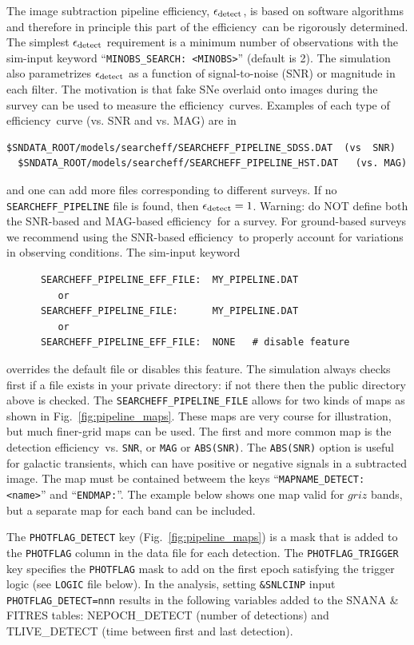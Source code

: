 \documentclass[12pt]{article}
\newcommand{\eff}{efficiency}
\newcommand{\simeffsub}{\epsilon_{\rm detect}}  %
\begin{document}
{The image subtraction pipeline \eff, $\simeffsub$,
is based on software algorithms and therefore
in principle this part of the \eff\ can be 
rigorously determined.
The simplest $\simeffsub$ requirement
is a minimum number of observations with
the sim-input keyword ``{\tt MINOBS\_SEARCH: <MINOBS>}''
(default is 2).
The simulation also parametrizes $\simeffsub$ as a function
of signal-to-noise (SNR) or magnitude in each filter.
The motivation is that fake SNe overlaid onto
images during the survey can be used to measure 
the \eff\ curves. Examples of each type of \eff\
curve (vs. SNR and vs. MAG) are in 
%
\begin{Verbatim}[frame=single]
  $SNDATA_ROOT/models/searcheff/SEARCHEFF_PIPELINE_SDSS.DAT  (vs  SNR)
  $SNDATA_ROOT/models/searcheff/SEARCHEFF_PIPELINE_HST.DAT   (vs. MAG)
\end{Verbatim}
and one can add more files corresponding to different surveys.
If no {\tt SEARCHEFF\_PIPELINE} file is found, then $\simeffsub=1$.
Warning: do NOT define both the SNR-based and MAG-based
\eff\ for a survey. For ground-based surveys we recommend
using the SNR-based \eff\ to properly account for variations
in observing conditions. The sim-input keyword
\begin{verbatim}
      SEARCHEFF_PIPELINE_EFF_FILE:  MY_PIPELINE.DAT
         or
      SEARCHEFF_PIPELINE_FILE:      MY_PIPELINE.DAT
         or
      SEARCHEFF_PIPELINE_EFF_FILE:  NONE   # disable feature
\end{verbatim}
%
overrides the default file or disables this feature.
The simulation always checks first if a file exists
in your private directory: if not there then the
public directory above is checked. 
The {\tt SEARCHEFF\_PIPELINE\_FILE} allows for two kinds
of maps as shown in Fig.~\ref{fig:pipeline_maps}.
These maps are very course for illustration, but
much finer-grid maps can be used.
The first and more common map is the detection \eff\
vs. {\tt SNR}, or {\tt MAG} or {\tt ABS(SNR)}.
The {\tt ABS(SNR)} option is useful for galactic transients,
which can have positive or negative signals in a subtracted image.
The map must be contained betweem the keys 
``{\tt MAPNAME\_DETECT: <name>}'' and ``{\tt ENDMAP:}''. 
The example below shows one map valid
for $griz$ bands, but a separate map for each band can be included.

The {\tt PHOTFLAG\_DETECT} key (Fig.~\ref{fig:pipeline_maps})
is a mask that is added to the {\tt PHOTFLAG} column in the data
file for each detection. The {\tt PHOTFLAG\_TRIGGER} key specifies
the {\tt PHOTFLAG} mask to add on the first epoch satisfying
the trigger logic (see {\tt LOGIC} file below).
In the analysis, setting {\tt \&SNLCINP} input 
{\tt PHOTFLAG\_DETECT=nnn} results in the following variables
added to the SNANA \& FITRES tables: 
{NEPOCH\_DETECT} (number of detections) and 
{TLIVE\_DETECT} (time between first and last detection).

}
\end{document}
